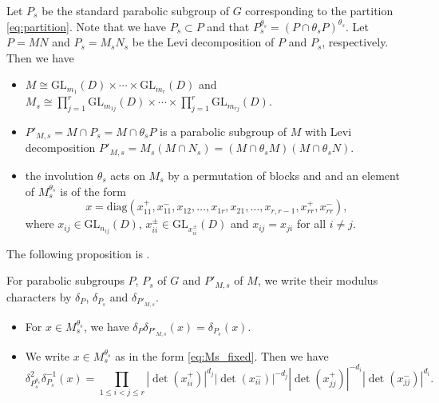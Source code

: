 \documentclass[11pt,letterpaper]{amsart}
\newcommand{\GL}{{\mathrm {GL}}} \newcommand{\PGL}{{\mathrm {PGL}}}
\def\diag{\mathrm{diag}}
\theoremstyle{plain}
\numberwithin{equation}{section}
\begin{document}
Let $P_s$ be the standard parabolic subgroup of $G$ corresponding to the partition \eqref{eq:partition}.
Note that we have $P_s\subset P$ and that $P_s^{\theta_s}=(P\cap \theta_sP)^{\theta_s}$.
Let $P=MN$ and $P_s=M_sN_s$ be the Levi decomposition of $P$ and $P_s$,  respectively.
Then we have
\begin{itemize}
\item $M\cong \GL_{m_1}(D)\times \cdots \times \GL_{m_r}(D)$ and $M_s\cong \prod_{j=1}^r\GL_{m_{1j}}(D) \times \cdots \times \prod_{j=1}^r \GL_{m_{rj}}(D)$.
\item $P'_{M,  s}=M\cap P_s=M\cap\theta_sP$ is a parabolic subgroup of $M$ with Levi decomposition $P'_{M,  s}=M_s(M\cap N_s)=(M\cap\theta_sM)(M\cap\theta_sN)$. 
\item the involution $\theta_s$ acts on $M_s$ by a permutation of blocks and and an element of $M_s^{\theta_s}$ is of the form
    \begin{equation}\label{eq:Ms_fixed}
    x=\diag(x_{11}^+,  x_{11}^-,  x_{12},  \ldots,  x_{1r},  x_{21},  \ldots,  x_{r,r-1},  x_{rr}^+,  x_{rr}^-),
    \end{equation}
where $x_{ij}\in\GL_{n_{ij}}(D)$,  $x_{ii}^\pm\in\GL_{x_{ii}^\pm}(D)$ and $x_{ij}=x_{ji}$ for all $i\neq j$.
\end{itemize}
The following proposition is \cite[Proposition 3.6]{MatCRELLE}.
 
\begin{prop}\label{prop}
For parabolic subgroups $P$,  $P_s$ of $G$ and $P'_{M,  s}$ of $M$,  we write their modulus characters by $\delta_P$,  $\delta_{P_s}$ and $\delta_{P'_{M,  s}}$.
\begin{itemize}
\item[(1)] For $x\in M_s^{\theta_s}$,  we have $\delta_P\delta_{P'_{M,  s}}(x)=\delta_{P_s}(x)$.
\item[(2)] We write $x\in M_s^{\theta_s}$ as in the form \eqref{eq:Ms_fixed}.
Then we have
    \[
    \delta^2_{P_s^{\theta_s}}\delta_{P_s}^{-1}(x) = \prod_{1\leq i < j \leq r}
    |\det(x_{ii}^+)|^{d_j}|\det(x_{ii}^-)|^{-d_j}
    |\det(x_{jj}^+)|^{-d_i}|\det(x_{jj}^{-})|^{d_i}.
    \]
\end{itemize}
\end{prop}
\end{document}
